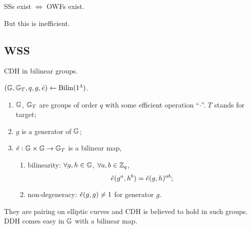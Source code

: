 \begin{theorem}
	\acp{SS} exist $\iff$ \acp{OWF} exist.
\end{theorem}
But this is inefficient.

\subsection{\acl{WSS}}

\ac{CDH} in bilinear groups.

\begin{definition}
	$\left( \mathbb{G}, \mathbb{G}_{T}, q, g, \hat{e} \right) \leftarrow \mathrm{Bilin}(1^{\lambda})$.
	\begin{enumerate}
		\item $\mathbb{G}$, $\mathbb{G}_{T}$ are groups of order $q$ with some efficient operation ``$\cdot$''.
			$T$ stands for target;
		\item $g$ is a generator of $\mathbb{G}$;
		\item $\hat{e} : \mathbb{G} \times \mathbb{G} \to \mathbb{G}_{T}$ is a bilinear map, \ie
			\begin{enumerate}
				\item bilinearity: $\forall g, h \in \mathbb{G}$, $\forall a, b \in \mathbb{Z}_q$,
					\begin{equation*}
						\hat{e}(g^a, h^b) = \hat{e}(g, h)^{ab};
					\end{equation*}
				\item non-degeneracy: $\hat{e}(g,g) \neq 1$ for generator $g$. \qedhere
			\end{enumerate}
	\end{enumerate}
\end{definition}

\begin{observation}
	They are pairing on elliptic curves and \ac{CDH} is believed to hold in such groups.
	\ac{DDH} comes easy in $\mathbb{G}$ with a bilinear map.
\end{observation}

